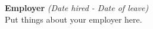 \documentclass[class=article, crop=false]{standalone}
\begin{document}
\textbf{Employer} \textsl{(Date hired - Date of leave)} \\
Put things about your employer here.
\end{document}
